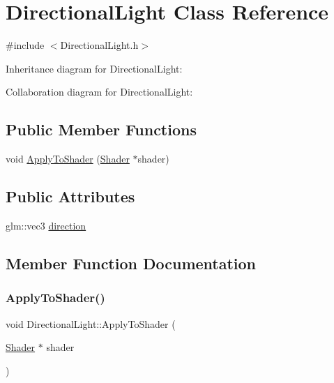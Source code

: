 \hypertarget{class_directional_light}{}\section{Directional\+Light Class Reference}
\label{class_directional_light}


{\ttfamily \#include $<$Directional\+Light.\+h$>$}



Inheritance diagram for Directional\+Light\+:


Collaboration diagram for Directional\+Light\+:
\subsection*{Public Member Functions}
\begin{DoxyCompactItemize}
\item 
void \mbox{\hyperlink{class_directional_light_a258c15fc957f8ffb76161dc000830418}{Apply\+To\+Shader}} (\mbox{\hyperlink{class_shader}{Shader}} $\ast$shader)
\end{DoxyCompactItemize}
\subsection*{Public Attributes}
\begin{DoxyCompactItemize}
\item 
glm\+::vec3 \mbox{\hyperlink{class_directional_light_a5b2956fd8583e5ef45fbf1f1e778cd39}{direction}}
\end{DoxyCompactItemize}


\subsection{Member Function Documentation}
\mbox{\label{class_directional_light_a258c15fc957f8ffb76161dc000830418}} 
\subsubsection{\texorpdfstring{ApplyToShader()}{ApplyToShader()}}
{\footnotesize\ttfamily void Directional\+Light\+::\+Apply\+To\+Shader (\begin{DoxyParamCaption}\item[{\mbox{\hyperlink{class_shader}{Shader}} $\ast$}]{shader }\end{DoxyParamCaption})}



